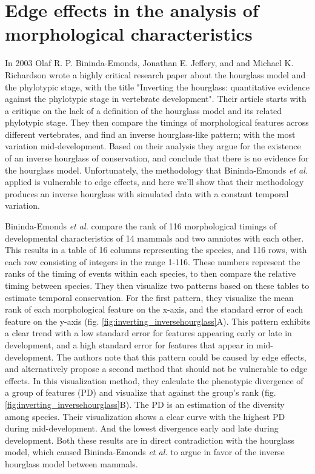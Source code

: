 \chapter{Edge effects in the analysis of morphological characteristics}\thumbforchapter
\newpage

In 2003 Olaf R. P. Bininda-Emonds, Jonathan E. Jeffery, and and Michael K. Richardson wrote a highly critical research paper about the hourglass model and the phylotypic stage, with the title "Inverting the hourglass: quantitative evidence against the phylotypic stage in vertebrate development"\cite{OlafRP2003}. Their article starts with a critique on the lack of a definition of the hourglass model and its related phylotypic stage. They then compare the timings of morphological features across different vertebrates, and find an inverse hourglass-like pattern; with the most variation mid-development. Based on their analysis they argue for the existence of an inverse hourglass of conservation, and conclude that there is no evidence for the hourglass model. Unfortunately, the methodology that Bininda-Emonds \textit{et al.} applied is vulnerable to edge effects, and here we'll show that their methodology produces an inverse hourglass with simulated data with a constant temporal variation.

Bininda-Emonds \textit{et al.} compare the rank of 116 morphological timings of developmental characteristics of 14 mammals and two amniotes with each other. This results in a table of 16 columns representing the species, and 116 rows, with each row consisting of integers in the range 1-116. These numbers represent the ranks of the timing of events within each species, to then compare the relative timing between species. They then visualize two patterns based on these tables to estimate temporal conservation. For the first pattern, they visualize the mean rank of each morphological feature on the x-axis, and the standard error of each feature on the y-axis (fig. \ref{fig:inverting_inversehourglass}A). This pattern exhibits a clear trend with a low standard error for features appearing early or late in development, and a high standard error for features that appear in mid-development. The authors note that this pattern could be caused by edge effects, and alternatively propose a second method that should not be vulnerable to edge effects. In this visualization method, they calculate the phenotypic divergence of a group of features (PD) and visualize that against the group's rank (fig. \ref{fig:inverting_inversehourglass}B). The PD is an estimation of the diversity among species. Their visualization shows a clear curve with the highest PD during mid-development. And the lowest divergence early and late during development. Both these results are in direct contradiction with the hourglass model, which caused Bininda-Emonds \textit{et al.} to argue in favor of the inverse hourglass model between mammals.


